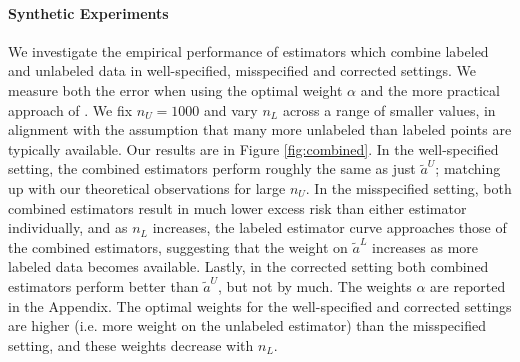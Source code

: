 

\paragraph{Synthetic Experiments} We investigate the empirical performance of estimators which combine labeled and unlabeled data in well-specified, misspecified and corrected settings. We measure both the error when using the optimal weight $\alpha$ and the more practical approach of \cite{GreenStrawderman2001}. We fix $n_U=1000$ and vary $n_L$ across a range of smaller values, in alignment with the assumption that many more unlabeled than labeled points are typically available. Our results are in Figure \ref{fig:combined}. In the well-specified setting, the combined estimators perform roughly the same as just $\widetilde{a}^U$; matching up with our theoretical observations for large $n_U$. In the misspecified setting, both combined estimators result in much lower excess risk than either estimator individually, and as $n_L$ increases, the labeled estimator curve approaches those of the combined estimators, suggesting that the weight on $\widetilde{a}^L$ increases as more labeled data becomes available. Lastly, in the corrected setting both combined estimators perform better than $\widetilde{a}^U$, but not by much.
The weights $\alpha$ are reported in the Appendix. The optimal weights for the well-specified and corrected settings are higher (i.e. more weight on the unlabeled estimator) than the misspecified setting, and these weights decrease with $n_L$.


